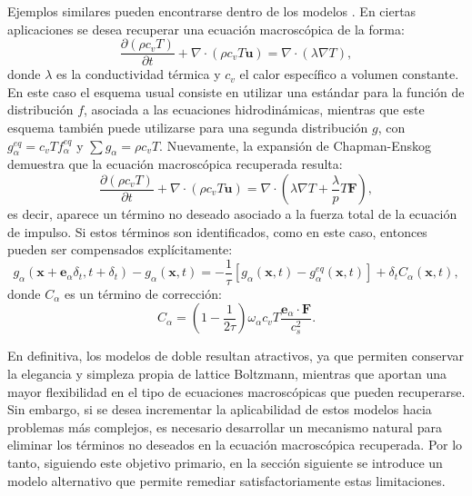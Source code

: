 Ejemplos similares pueden encontrarse dentro de los modelos \pp{} \cite{li_effect_2014}. En ciertas aplicaciones se desea recuperar una ecuaci\'on macrosc\'opica de la forma:
\begin{equation}
	\dfrac{\partial (\rho c_v T)}{\partial t} + \nabla \cdot (\rho c_v T \bm{u}) = \nabla \cdot (\lambda \nabla T),
\end{equation}
donde $\lambda$ es la conductividad t\'ermica y $c_v$ el calor espec\'ifico a volumen constante. En este caso el esquema usual consiste en utilizar una \lbe{} \pp{} est\'andar para la funci\'on de distribuci\'on $f$, asociada a las ecuaciones hidrodin\'amicas, mientras que este esquema tambi\'en puede utilizarse para una segunda distribuci\'on $g$, con $g^{eq}_{\alpha} = c_v T f^{eq}_{\alpha}$ y $\sum g_{\alpha} = \rho c_v T$. Nuevamente, la expansi\'on de Chapman-Enskog demuestra que la ecuaci\'on macrosc\'opica recuperada resulta:
\begin{equation}
	\dfrac{\partial (\rho c_v T)}{\partial t} + \nabla \cdot (\rho c_v T \bm{u}) = \nabla \cdot \left(\lambda \nabla T + \dfrac{\lambda}{p}T\bm{F} \right),
	\label{eq:e_macro_F}
\end{equation}
es decir, aparece un t\'ermino no deseado asociado a la fuerza total de la ecuaci\'on de impulso. Si estos t\'erminos son identificados, como en este caso, entonces pueden ser compensados expl\'icitamente:
\begin{equation}
	g_{\alpha}(\bm{x}+\bm{e}_{\alpha}\delta_t, t+\delta_t) - g_{\alpha}(\bm{x},t) = -\dfrac{1}{\tau} \left[ g_{\alpha}(\bm{x},t) - g^{eq}_{\alpha}(\bm{x},t) \right] + \delta_t C_{\alpha}(\bm{x},t),
\end{equation}
donde $C_{\alpha}$ es un t\'ermino de correcci\'on:
\begin{equation}
	C_{\alpha} = \left( 1-\dfrac{1}{2\tau} \right)\omega_{\alpha}c_v T \dfrac{\bm{e}_{\alpha} \cdot \bm{F}}{c_s^2}.
\end{equation}


En definitiva, los modelos de doble \fdp{} resultan atractivos, ya que permiten conservar la elegancia y simpleza propia de lattice Boltzmann, mientras que aportan una mayor flexibilidad en el tipo de ecuaciones macrosc\'opicas que pueden recuperarse. Sin embargo, si se desea incrementar la aplicabilidad de estos modelos hacia problemas m\'as complejos, es necesario desarrollar un mecanismo natural para eliminar los t\'erminos no deseados en la ecuaci\'on macrosc\'opica recuperada. Por lo tanto, siguiendo este objetivo primario, en la secci\'on siguiente se introduce un modelo alternativo que permite remediar satisfactoriamente estas limitaciones.


